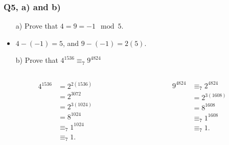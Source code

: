 \documentclass[handout]{beamer}
\begin{document}
\begin{frame}
\frametitle{Q5, a) and b)}
\begin{enumerate}
\item[a)] Prove that $4 = 9 = -1 \mod 5$. 
\end{enumerate}
\begin{itemize}
\item $4 - (-1) = 5$, and $9 - (-1) = 2(5)$.
\end{itemize}
\vspace{0.5cm}
\begin{enumerate}
\item[b)] Prove that $4^{1536}\equiv_7 9^{4824}$
\end{enumerate}

\begin{columns}
\begin{column}{0.5\textwidth}
\begin{align*}
4^{1536} &= 2^{2(1536)} \\
&= 2^{3072} \\
&= 2^{3(1024)} \\
&= 8^{1024}\\
&\equiv_7 1^{1024}\\
&\equiv_7 1. 
\end{align*}
\end{column}
\begin{column}{0.5\textwidth}
\begin{align*}
9^{4824} & \equiv_7 2^{4824} \\
&= 2^{3(1608)} \\
&=8^{1608} \\
&\equiv_7 1^{1608} \\
& \equiv_7 1.
\end{align*}
\end{column}
\end{columns}

\end{frame}
\end{document}
